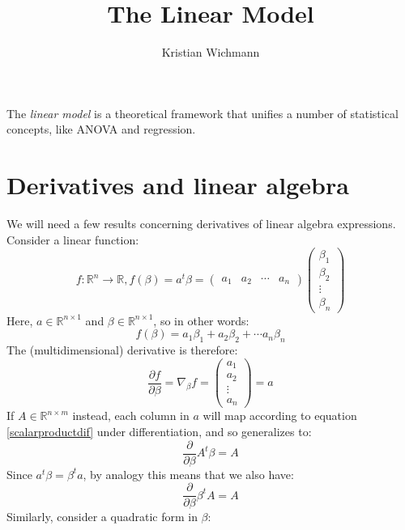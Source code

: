 \documentclass[12pt, a4paper]{article}
\title{The Linear Model}
\author{Kristian Wichmann}
\begin{document}
\maketitle

The \textit{linear model} is a theoretical framework that unifies a number of statistical concepts, like ANOVA and regression.

\section{Derivatives and linear algebra}
We will need a few results concerning derivatives of linear algebra expressions. Consider a linear function:
\begin{equation}
f: \mathbb{R}^n\rightarrow\mathbb{R}, f(\beta)=a^t\beta=
\begin{pmatrix}
a_1 & a_2 & \cdots & a_n
\end{pmatrix}
\begin{pmatrix}
\beta_1 \\ \beta_2 \\ \vdots \\ \beta_n
\end{pmatrix}
\end{equation}
Here, $a\in\mathbb{R}^{n\times 1}$ and $\beta\in\mathbb{R}^{n\times 1}$, so in other words:
\begin{equation}
f(\beta)=a_1\beta_1+a_2\beta_2+\cdots a_n\beta_n
\end{equation}
The (multidimensional) derivative is therefore:
\begin{equation}
\label{scalarproductdif}
\frac{\partial f}{\partial \beta}=\nabla_\beta f=
\begin{pmatrix}
a_1 \\ a_2 \\ \vdots \\ a_n
\end{pmatrix}
=a
\end{equation}
If $A\in\mathbb{R}^{n\times m}$ instead, each column in $a$ will map according to equation \ref{scalarproductdif} under differentiation, and so generalizes to:
\begin{equation}
\label{matrixdif}
\frac{\partial}{\partial\beta}A^t\beta = A
\end{equation}
Since $a^t\beta=\beta^t a$, by analogy this means that we also have:
\begin{equation}
\label{matrixdif2}
\frac{\partial}{\partial\beta}\beta^t A = A
\end{equation}
Similarly, consider a quadratic form in $\beta$:
\end{document}
